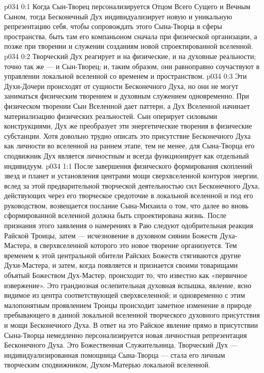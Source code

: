 \author{Могучий Вестник}
\vs p034 0:1 Когда Сын\hyp{}Творец персонализируется Отцом Всего Сущего и Вечным Сыном, тогда Бесконечный Дух индивидуализирует новую и уникальную репрезентацию себя, чтобы сопровождать этого Сына\hyp{}Творца в сферы пространства, быть там его компаньоном сначала при физической организации, а позже при творении и служении созданиям новой спроектированной вселенной.
\vs p034 0:2 Творческий Дух реагирует и на физические, и на духовные реальности; точно так же --- и Сын\hyp{}Творец; и, таким образом, они равноправно соучаствуют в управлении локальной вселенной со временем и пространством.
\vs p034 0:3 Эти Духи\hyp{}Дочери происходят от сущности Бесконечного Духа, но они не могут заниматься физическим творением и духовным служением одновременно. При физическом творении Сын Вселенной дает паттерн, а Дух Вселенной начинает материализацию физических реальностей. Сын оперирует силовыми конструкциями, Дух же преобразует эти энергетические творения в физические субстанции. Хотя довольно трудно описать это присутствие Бесконечного Духа как личности во вселенной на раннем этапе, тем не менее, для Сына\hyp{}Творца его сподвижник Дух является личностным и всегда функционирует как отдельный индивидуум.
\vs p034 1:1 После завершения физического формирования скоплений звезд и планет и установления центрами мощи сверхвселенной контуров энергии, вслед за этой предварительной творческой деятельностью сил Бесконечного Духа, действующих через его творческое средоточие в локальной вселенной и под его руководством, возвещается послание Сына\hyp{}Михаила о том, что далее во вновь сформированной вселенной должна быть спроектирована жизнь. После признания этого заявления о намерениях в Раю следуют одобрительная реакция Райской Троицы, затем --- исчезновение в духовном сиянии Божеств Духа\hyp{}Мастера, в сверхвселенной которого это новое творение организуется. Тем временем к этой центральной обители Райских Божеств стягиваются другие Духи\hyp{}Мастера, и затем, когда появляется и признается своими товарищами объятый Божеством Дух\hyp{}Мастер, происходит то, что известно как «первичное извержение». Это грандиозная ослепительная духовная вспышка, явление, ясно видимое из центра соответствующей сверхвселенной; и одновременно с этим малопонятным проявлением Троицы происходит заметное изменение в природе пребывающего в данной локальной вселенной творческого духовного присутствия и мощи Бесконечного Духа. В ответ на это Райское явление прямо в присутствии Сына\hyp{}Творца немедленно персонализируется новая личностная репрезентация Бесконечного Духа. Это Божественная Служительница. Творческий Дух --- индивидуализированная помощница Сына\hyp{}Творца --- стала его личным творческим сподвижником, Духом\hyp{}Матерью локальной вселенной.
